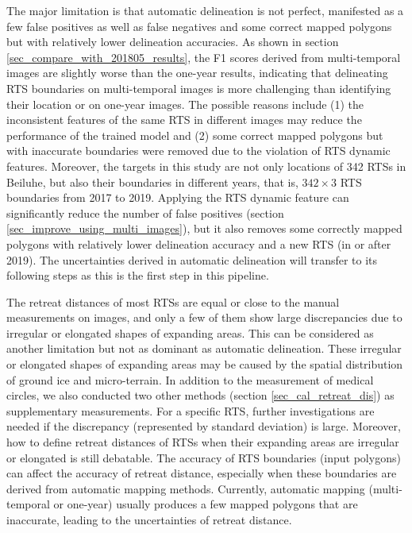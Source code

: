 \documentclass[authoryear,preprint,review,12pt]{elsarticle}
\begin{document}
The major limitation is that automatic delineation is not perfect, manifested as a few false positives as well as false negatives and some correct mapped polygons but with relatively lower delineation accuracies. 
As shown in section \ref{sec_compare_with_201805_results}, the F1 scores derived from multi-temporal images are slightly worse than the one-year results, indicating that 
delineating RTS boundaries on multi-temporal images is more challenging than identifying their location or on one-year images.
The possible reasons include (1) the inconsistent features of the same RTS in different images may reduce the performance of the trained model 
and (2) some correct mapped polygons but with inaccurate boundaries were removed due to the violation of RTS dynamic features. 
Moreover, the targets in this study are not only locations of 342 RTSs in Beiluhe, but also their boundaries in different years, that is, $342\times3$ RTS boundaries from 2017 to 2019.
Applying the RTS dynamic feature can significantly reduce the number of false positives (section \ref{sec_improve_using_multi_images}), but it also removes some correctly mapped polygons with relatively lower delineation accuracy and a new RTS (in or after 2019). 
The uncertainties derived in automatic delineation will transfer to its following steps as this is the first step in this pipeline. 


The retreat distances of most RTSs are equal or close to the manual measurements on images, and only a few of them show large discrepancies due to irregular or elongated shapes of expanding areas. 
This can be considered as another limitation but not as dominant as automatic delineation. 
These irregular or elongated shapes of expanding areas may be caused by the spatial distribution of ground ice and micro-terrain.
In addition to the measurement of medical circles, we also conducted two other methods (section \ref{sec_cal_retreat_dis}) as supplementary measurements. 
For a specific RTS, further investigations are needed if the discrepancy (represented by standard deviation) is large. 
Moreover, how to define retreat distances of RTSs when their expanding areas are irregular or elongated is still debatable.
The accuracy of RTS boundaries (input polygons) can affect the accuracy of retreat distance, especially when these boundaries are derived from automatic mapping methods. 
Currently, automatic mapping (multi-temporal or one-year) usually produces a few mapped polygons that are inaccurate, leading to the uncertainties of retreat distance. 
\end{document}
